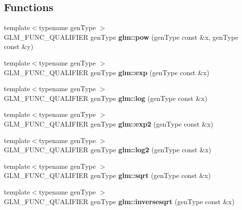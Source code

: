 \subsection*{\-Functions}
\begin{DoxyCompactItemize}
\item 
\hypertarget{namespaceglm_ae73d237165ef7e2a349314f51e7c4e12}{{\footnotesize template$<$typename gen\-Type $>$ }\\\-G\-L\-M\-\_\-\-F\-U\-N\-C\-\_\-\-Q\-U\-A\-L\-I\-F\-I\-E\-R gen\-Type {\bfseries glm\-::pow} (gen\-Type const \&x, gen\-Type const \&y)}\label{namespaceglm_ae73d237165ef7e2a349314f51e7c4e12}

\item 
\hypertarget{namespaceglm_ac7aaca662d294f91199a384547d16c10}{{\footnotesize template$<$typename gen\-Type $>$ }\\\-G\-L\-M\-\_\-\-F\-U\-N\-C\-\_\-\-Q\-U\-A\-L\-I\-F\-I\-E\-R gen\-Type {\bfseries glm\-::exp} (gen\-Type const \&x)}\label{namespaceglm_ac7aaca662d294f91199a384547d16c10}

\item 
\hypertarget{namespaceglm_ab494f317a19754e741df6c9f2b2bc0a9}{{\footnotesize template$<$typename gen\-Type $>$ }\\\-G\-L\-M\-\_\-\-F\-U\-N\-C\-\_\-\-Q\-U\-A\-L\-I\-F\-I\-E\-R gen\-Type {\bfseries glm\-::log} (gen\-Type const \&x)}\label{namespaceglm_ab494f317a19754e741df6c9f2b2bc0a9}

\item 
\hypertarget{namespaceglm_a71ea2ab14812027d503236ae7a8a9bc2}{{\footnotesize template$<$typename gen\-Type $>$ }\\\-G\-L\-M\-\_\-\-F\-U\-N\-C\-\_\-\-Q\-U\-A\-L\-I\-F\-I\-E\-R gen\-Type {\bfseries glm\-::exp2} (gen\-Type const \&x)}\label{namespaceglm_a71ea2ab14812027d503236ae7a8a9bc2}

\item 
\hypertarget{namespaceglm_a86625ff1032719b36389d356a59270aa}{{\footnotesize template$<$typename gen\-Type $>$ }\\\-G\-L\-M\-\_\-\-F\-U\-N\-C\-\_\-\-Q\-U\-A\-L\-I\-F\-I\-E\-R gen\-Type {\bfseries glm\-::log2} (gen\-Type const \&x)}\label{namespaceglm_a86625ff1032719b36389d356a59270aa}

\item 
\hypertarget{namespaceglm_a3512411e7e0055ca87d5086fe7717dd3}{{\footnotesize template$<$typename gen\-Type $>$ }\\\-G\-L\-M\-\_\-\-F\-U\-N\-C\-\_\-\-Q\-U\-A\-L\-I\-F\-I\-E\-R gen\-Type {\bfseries glm\-::sqrt} (gen\-Type const \&x)}\label{namespaceglm_a3512411e7e0055ca87d5086fe7717dd3}

\item 
\hypertarget{namespaceglm_ab71ffb674cbfa24ed93b2d5e57f123f1}{{\footnotesize template$<$typename gen\-Type $>$ }\\\-G\-L\-M\-\_\-\-F\-U\-N\-C\-\_\-\-Q\-U\-A\-L\-I\-F\-I\-E\-R gen\-Type {\bfseries glm\-::inversesqrt} (gen\-Type const \&x)}\label{namespaceglm_ab71ffb674cbfa24ed93b2d5e57f123f1}

\end{DoxyCompactItemize}


